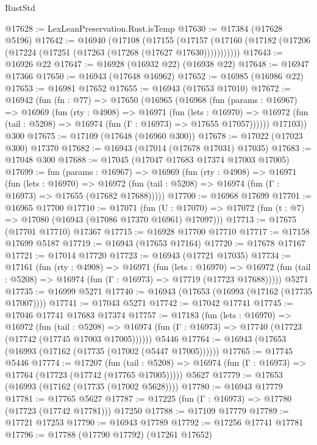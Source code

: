\begin{lexlean}{RustStd}
\begin{coremodule}
@17628 := LexLeanPreservation.Rust.isTemp
@17630 := @17384 (@17628 @5196)
@17642 := @16940
    (@17108
      (@17155
        (@17157 (@17160 (@17182 (@17206 (@17224 (@17251 (@17263 (@17268 (@17627 @17630)))))))))))
@17643 := @16926 @22
@17647 := @16928 (@16932 @22) (@16938 @22)
@17648 := @16947 @17366
@17650 := @16943 (@17648 @16962)
@17652 := @16985 (@16986 @22)
@17653 := @16981 @17652
@17655 := @16943 (@17653 @17010)
@17672 := @16942
    (fun (fn : @77) =>
    @17650
      (@16965
        (@16968
          (fun (params : @16967) =>
          @16969
            (fun (rty : @4908) =>
            @16971
              (fun (lets : @16970) =>
              @16972 (fun (tail : @5208) => @16974 (fun (Γ : @16973) => @17655 @17057))))))
        @17103))
    @300
@17675 := @17109 (@17648 (@16960 @300))
@17678 := @17022 (@17023 @300) @17370
@17682 := @16943 (@17014 (@17678 @17031) @17035)
@17683 := @17048 @300
@17688 := @17045 (@17047 @17683 @17374 @17003 @17005)
@17699 := fun (params : @16967) =>
  @16969
    (fun (rty : @4908) =>
    @16971
      (fun (lets : @16970) =>
      @16972 (fun (tail : @5208) => @16974 (fun (Γ : @16973) => @17655 (@17682 @17688)))))
@17700 := @16968 @17699
@17701 := @16965 @17700
@17710 := @17071
    (fun (U : @17070) => @17072 (fun (t : @7) => @17080 (@16943 (@17086 @17370 @16961) @17097)))
@17713 := @17675 (@17701 @17710) @17367
@17715 := @16928 @17700 @17710
@17717 := @17158 @17699 @5187
@17719 := @16943 (@17653 @17164)
@17720 := @17678 @17167
@17721 := @17014 @17720
@17723 := @16943 (@17721 @17035)
@17734 := @17161
    (fun (rty : @4908) =>
    @16971
      (fun (lets : @16970) =>
      @16972 (fun (tail : @5208) => @16974 (fun (Γ : @16973) => @17719 (@17723 @17688)))))
    @5271
@17735 := @16999 @5271
@17740 := @16943 (@17653 (@16993 (@17162 (@17735 @17007))))
@17741 := @17043 @5271
@17742 := @17042 @17741
@17745 := @17046 @17741 @17683 @17374
@17757 := @17183
    (fun (lets : @16970) =>
    @16972
      (fun (tail : @5208) =>
      @16974 (fun (Γ : @16973) => @17740 (@17723 (@17742 (@17745 @17003 @17005))))))
    @5446
@17764 := @16943 (@17653 (@16993 (@17162 (@17735 (@17002 (@5447 @17005))))))
@17765 := @17745 @5446
@17774 := @17207
    (fun (tail : @5208) => @16974 (fun (Γ : @16973) => @17764 (@17723 (@17742 (@17765 @17005)))))
    @5627
@17779 := @17653 (@16993 (@17162 (@17735 (@17002 @5628))))
@17780 := @16943 @17779
@17781 := @17765 @5627
@17787 := @17225 (fun (Γ : @16973) => @17780 (@17723 (@17742 @17781))) @17250
@17788 := @17109 @17779
@17789 := @17721 @17253
@17790 := @16943 @17789
@17792 := @17256 @17741 @17781
@17796 := @17788 (@17790 @17792) (@17261 @17652)

\end{coremodule}
\end{lexlean}
